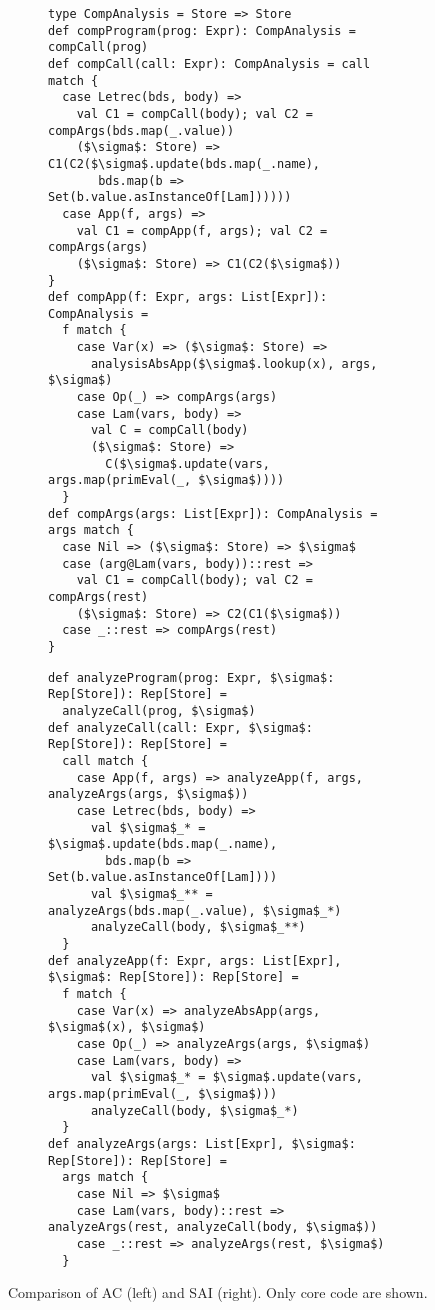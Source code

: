 \begin{figure*}
  \centering
  \begin{subfigure}[h]{0.49\textwidth}
    \centering
    \begin{lstlisting}
type CompAnalysis = Store => Store
def compProgram(prog: Expr): CompAnalysis = compCall(prog)
def compCall(call: Expr): CompAnalysis = call match {
  case Letrec(bds, body) =>
    val C1 = compCall(body); val C2 = compArgs(bds.map(_.value))
    ($\sigma$: Store) => C1(C2($\sigma$.update(bds.map(_.name), 
       bds.map(b => Set(b.value.asInstanceOf[Lam])))))
  case App(f, args) =>
    val C1 = compApp(f, args); val C2 = compArgs(args)
    ($\sigma$: Store) => C1(C2($\sigma$))
}
def compApp(f: Expr, args: List[Expr]): CompAnalysis = 
  f match {
    case Var(x) => ($\sigma$: Store) => 
      analysisAbsApp($\sigma$.lookup(x), args, $\sigma$)
    case Op(_) => compArgs(args)
    case Lam(vars, body) =>
      val C = compCall(body)
      ($\sigma$: Store) => 
        C($\sigma$.update(vars, args.map(primEval(_, $\sigma$))))
  }
def compArgs(args: List[Expr]): CompAnalysis = args match {
  case Nil => ($\sigma$: Store) => $\sigma$
  case (arg@Lam(vars, body))::rest =>
    val C1 = compCall(body); val C2 = compArgs(rest)
    ($\sigma$: Store) => C2(C1($\sigma$))
  case _::rest => compArgs(rest)
}
  \end{lstlisting}
  \end{subfigure}
\hfill
  \begin{subfigure}[h]{0.49\textwidth}
    \centering
    \begin{lstlisting}
def analyzeProgram(prog: Expr, $\sigma$: Rep[Store]): Rep[Store] = 
  analyzeCall(prog, $\sigma$)
def analyzeCall(call: Expr, $\sigma$: Rep[Store]): Rep[Store] = 
  call match {
    case App(f, args) => analyzeApp(f, args, analyzeArgs(args, $\sigma$))
    case Letrec(bds, body) =>
      val $\sigma$_* = $\sigma$.update(bds.map(_.name), 
        bds.map(b => Set(b.value.asInstanceOf[Lam])))
      val $\sigma$_** = analyzeArgs(bds.map(_.value), $\sigma$_*)
      analyzeCall(body, $\sigma$_**)
  }
def analyzeApp(f: Expr, args: List[Expr], $\sigma$: Rep[Store]): Rep[Store] = 
  f match {
    case Var(x) => analyzeAbsApp(args, $\sigma$(x), $\sigma$)
    case Op(_) => analyzeArgs(args, $\sigma$)
    case Lam(vars, body) =>
      val $\sigma$_* = $\sigma$.update(vars, args.map(primEval(_, $\sigma$)))
      analyzeCall(body, $\sigma$_*)
  }
def analyzeArgs(args: List[Expr], $\sigma$: Rep[Store]): Rep[Store] = 
  args match {
    case Nil => $\sigma$
    case Lam(vars, body)::rest => analyzeArgs(rest, analyzeCall(body, $\sigma$))
    case _::rest => analyzeArgs(rest, $\sigma$)
  }
  \end{lstlisting}

  \end{subfigure}
  \caption{Comparison of AC (left) and SAI (right). Only core code are shown.}
  \label{compare_ac_sai}
\end{figure*}

